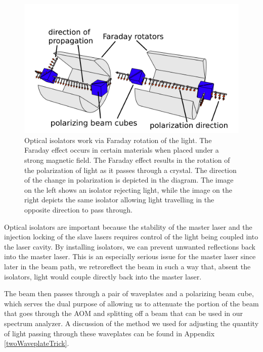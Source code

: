 \begin{figure}
\centerline{\includegraphics[width=1\textwidth]{isolators}}
\caption[Optical Isolator Illustration]{\label{isolatorPicture} Optical isolators work via Faraday rotation of the light. The Faraday effect occurs in certain materials when placed under a strong magnetic field. The Faraday effect results in the rotation of the polarization of light as it passes through a crystal. The direction of the change in polarization is depicted in the diagram. The image on the left shows an isolator rejecting light, while the image on the right depicts the same isolator allowing light travelling in the opposite direction to pass through.}
\end{figure}

Optical isolators are important because the stability of the master laser and the injection locking of the slave lasers requires control of the light being coupled into the laser cavity. By installing isolators, we can prevent unwanted reflections back into the master laser. This is an especially serious issue for the master laser since later in the beam path, we retroreflect the beam in such a way that, absent the isolators, light would couple directly back into the master laser. 

The beam then passes through a pair of waveplates and a polarizing beam cube, which serves the dual purpose of allowing us to attenuate the portion of the beam that goes through the AOM and splitting off a beam that can be used in our spectrum analyzer. A discussion of the method we used for adjusting the quantity of light passing through these waveplates can be found in Appendix \ref{twoWaveplateTrick}.

